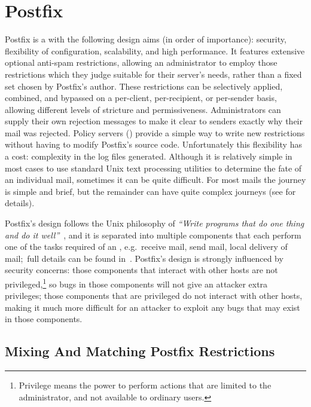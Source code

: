 \section{Postfix}

\label{postfix background}

Postfix is a  with the following design aims (in order of
importance): security, flexibility of configuration, scalability, and high
performance.  It features extensive optional anti-spam restrictions,
allowing an administrator to employ those restrictions which they judge
suitable for their server's needs, rather than a fixed set chosen by
Postfix's author.  These restrictions can be selectively applied, combined,
and bypassed on a per-client, per-recipient, or per-sender basis, allowing
different levels of stricture and permissiveness.  Administrators can
supply their own rejection messages to make it clear to senders exactly why
their mail was rejected.  Policy servers ()
provide a simple way to write new restrictions without having to modify
Postfix's source code.  Unfortunately this flexibility has a cost:
complexity in the log files generated.  Although it is relatively simple in
most cases to use standard Unix text processing utilities to determine the
fate of an individual mail, sometimes it can be quite difficult.  For
most mails the journey is simple and brief, but the remainder can have
quite complex journeys (see  for details).

Postfix's design follows the Unix philosophy of \textit{``Write programs
that do one thing and do it well''\/}~\cite{unix-philosophy}, and it is
separated into multiple components that each perform one of the tasks
required of an , e.g.\ receive mail, send mail, local delivery
of mail;\ full details can be found in~\cite{postfix-overview}.  Postfix's
design is strongly influenced by security concerns: those components that
interact with other hosts are not privileged,\footnote{Privilege means the
power to perform actions that are limited to the administrator, and not
available to ordinary users.} so bugs in those components will not give an
attacker extra privileges; those components that are privileged do not
interact with other hosts, making it much more difficult for an attacker to
exploit any bugs that may exist in those components.

\subsection{Mixing And Matching Postfix Restrictions}

